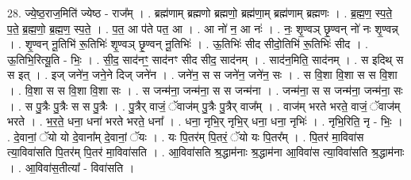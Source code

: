 \documentclass[17pt]{extarticle}
\begin{document}
28. ज्ये॒ष्ठ॒राज॒मिति॑ ज्येष्ठ - राज᳚म् । . ब्रह्म॑णाम् ब्रह्मणो ब्रह्मणो॒ ब्रह्म॑णा॒म् ब्रह्म॑णाम् ब्रह्मणः । . ब्र॒ह्म॒ण॒ स्प॒ते॒ प॒ते॒ ब्र॒ह्म॒णो॒ ब्र॒ह्म॒ण॒ स्प॒ते॒ । . प॒त॒ आ प॑ते पत॒ आ । . आ नो॑ न॒ आ नः॑ । . नः॒ शृ॒ण्वञ् छृ॒ण्वन् नो॑ नः शृ॒ण्वन्न् । . शृ॒ण्वन् नू॒तिभि॑ रू॒तिभिः॑ शृ॒ण्वञ् छृ॒ण्वन् नू॒तिभिः॑ । . ऊ॒तिभिः॑ सीद सीदो॒तिभि॑ रू॒तिभिः॑ सीद । . ऊ॒तिभि॒रित्यू॒ति - भिः॒ । . सी॒द॒ साद॑नꣳ॒॒ साद॑नꣳ सीद सीद॒ साद॑नम् । . साद॑न॒मिति॒ साद॑नम् । . स इदिथ् स स इत् । . इज् जने॑न॒ जने॒ने दिज् जने॑न । . जने॑न॒ स स जने॑न॒ जने॑न॒ सः । . स वि॒शा वि॒शा स स वि॒शा । . वि॒शा स स वि॒शा वि॒शा सः । . स जन्म॑ना॒ जन्म॑ना॒ स स जन्म॑ना । . जन्म॑ना॒ स स जन्म॑ना॒ जन्म॑ना॒ सः । . स पु॒त्रैः पु॒त्रैः स स पु॒त्रैः । . पु॒त्रैर् वाजं॒ ॅवाज॑म् पु॒त्रैः पु॒त्रैर् वाज᳚म् । . वाज॑म् भरते भरते॒ वाजं॒ ॅवाज॑म् भरते । . भ॒र॒ते॒ धना॒ धना॑ भरते भरते॒ धना᳚ । . धना॒ नृभि॒र् नृभि॒र् धना॒ धना॒ नृभिः॑ । . नृभि॒रिति॒ नृ - भिः॒ । . दे॒वानां॒ ॅयो यो दे॒वाना᳚म् दे॒वानां॒ ॅयः । . यः पि॒तर॑म् पि॒तरं॒ ॅयो यः पि॒तर᳚म् । . पि॒तर॑ मा॒विवा॑स त्या॒विवा॑सति पि॒तर॑म् पि॒तर॑ मा॒विवा॑सति । . आ॒विवा॑सति श्र॒द्धाम॑नाः श्र॒द्धाम॑ना आ॒विवा॑स त्या॒विवा॑सति श्र॒द्धाम॑नाः । . आ॒विवा॑स॒तीत्या᳚ - विवा॑सति । \newline
\end{document}
